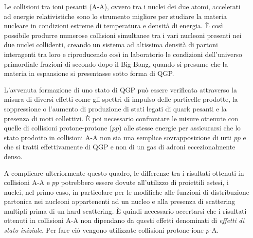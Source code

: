     Le collisioni tra ioni pesanti (A-A), ovvero tra i nuclei dei due atomi, accelerati ad energie relativistiche sono lo strumento migliore per studiare la materia nucleare in condizioni estreme di temperatura e densità di energia. È così possibile produrre numerose collisioni simultanee tra i vari nucleoni presenti nei due nuclei collidenti, creando un sistema ad altissima densità di partoni interagenti tra loro e riproducendo così in laboratorio le condizioni dell'universo primordiale frazioni di secondo dopo il Big-Bang, quando si presume che la materia in espansione si presentasse sotto forma di QGP.

    L'avvenuta formazione di uno stato di QGP può essere verificata attraverso la misura di diversi effetti come gli spettri di impulso delle particelle prodotte, la soppressione o l'aumento di produzione di stati legati di quark pesanti e la presenza di moti collettivi. È poi necessario confrontare le misure ottenute con quelle di collisioni protone-protone ($pp$) alle stesse energie per assicurarsi che lo stato prodotto in collisioni A-A non sia una semplice sovrapposizione di urti $pp$ e che si tratti effettivamente di QGP e non di un gas di adroni eccezionalmente denso.

    A complicare ulteriormente questo quadro, le differenze tra i risultati ottenuti in collisioni A-A e $pp$ potrebbero essere dovute all'utilizzo di proiettili estesi, i nuclei, nel primo caso, in particolare per le modifiche alle funzioni di distribuzione partonica nei nucleoni appartenenti ad un nucleo e alla presenza di scattering multipli prima di un hard scattering. È quindi necessario accertarsi che i risultati ottenuti in collisioni A-A non dipendano da questi effetti denominati di \textit{effetti di stato iniziale}. Per fare ciò vengono utilizzate collisioni protone-ione $p$-A.

